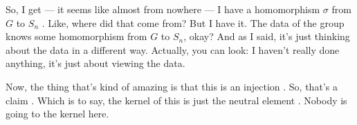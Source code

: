 \begin{speech}[01:13:43 - 01:14:36]
So, I get --- it seems like almost from nowhere --- I have a homomorphism $\sigma$ from $G$ to $S_n$ . Like, where did that come from? But I have it. The data of the group knows some homomorphism from $G$ to $S_n$, okay? And as I said, it's just thinking about the data in a different way. Actually, you can look: I haven't really done anything, it's just about viewing the data.

Now, the thing that's kind of amazing is that this is an injection . So, that's a claim . Which is to say, the kernel of this is just the neutral element . Nobody is going to the kernel here.
\end{speech}

\begin{content}
\end{content}


